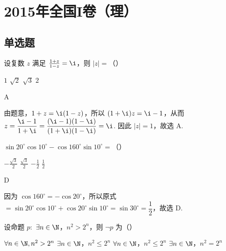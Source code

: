 \chapter{2015年全国I卷（理）}


\section{单选题}

\begin{problem}
设复数 \(z\) 满足 \(\frac{1 + z}{1 - z} = \i\)，则 \(|z| =\)（\quad）

\choices
    {\(1\)}
    {\(\sqrt{2}\)}
    {\(\sqrt{3}\)}
    {\(2\)}
\end{problem}

\begin{answer}
A
\end{answer}

\begin{solution}
由题意，\(1+z=\i(1-z)\)，所以 \((1+\i)z=\i-1\)，从而
\(z=\dfrac{\i-1}{1+\i}=\dfrac{(\i-1)(1-\i)}{(1+\i)(1-\i)}=\i\). 因此 \(|z|=1\)，故选 A.
\end{solution}

\begin{problem}
\(\sin 20^{\circ}\cos 10^{\circ} - \cos 160^{\circ}\sin 10^{\circ} =\)（\quad）

\choices
    {\(-\frac{\sqrt{3}}{2}\)}
    {\(\frac{\sqrt{3}}{2}\)}
    {\(-\frac{1}{2}\)}
    {\(\frac{1}{2}\)}
\end{problem}

\begin{answer}
D
\end{answer}

\begin{solution}
因为 \(\cos 160^{\circ}=-\cos 20^{\circ}\)，所以原式
\(=\sin 20^{\circ}\cos 10^{\circ}+\cos 20^{\circ}\sin 10^{\circ}=\sin 30^{\circ}=\dfrac12\)，故选 D.
\end{solution}

\begin{problem}
设命题 \(p:\) \(\exists n \in \N\)，\(n^2 > 2^n\)，则 \(\neg p\) 为（\quad）

\choices
    {\(\forall n\in \N,n^2 >2^n\)}
    {\(\exists n\in \N\)，\(n^2\leqslant 2^n\)}
    {\(\forall n\in \N\)，\(n^2\leqslant 2^n\)}
    {\(\exists n\in \N\)，\(n^2 = 2^n\)}
\end{problem}

